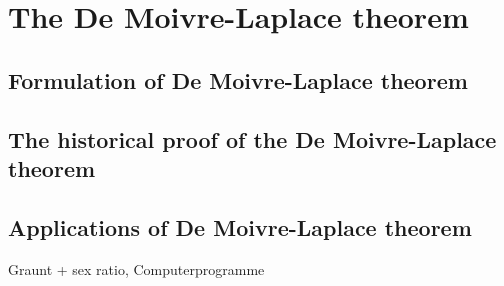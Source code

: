 \chapter{The De Moivre-Laplace theorem}

\section{Formulation of De Moivre-Laplace theorem}

\section{The historical proof of the De Moivre-Laplace theorem}

\section{Applications of De Moivre-Laplace theorem}

Graunt + sex ratio, Computerprogramme
